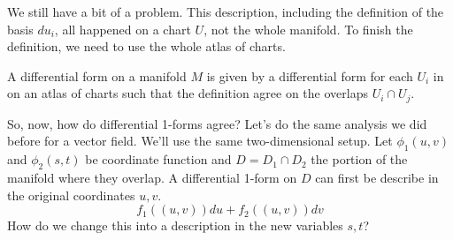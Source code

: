 \documentclass[fleqn,letterpaper]{report}
\begin{document}
We still have a bit of a problem. This description, including
the definition of the basis $du_i$, all happened on a chart
$U$, not the whole manifold. To finish the definition, we need
to use the whole atlas of charts. 

\begin{defn}
A differential form on a manifold $M$ is given by a
differential form for each $U_i$ in on an atlas of charts such
that the definition agree on the overlaps $U_i \cap U_j$. 
\end{defn}

So, now, how do differential 1-forms agree? Let's do the same
analysis we did before for a vector field. We'll use the same
two-dimensional setup. Let $\phi_1(u,v)$ and $\phi_2(s,t)$
be coordinate function and $D = D_1 \cap D_2$ the portion of
the manifold where they overlap. A differential 1-form on $D$ can
first be describe in the original coordinates $u,v$.
\begin{equation*}
f_1((u,v)) du + f_2((u,v)) dv 
\end{equation*}
How do we change this into a description in the new variables
$s,t$? 
\end{document}
